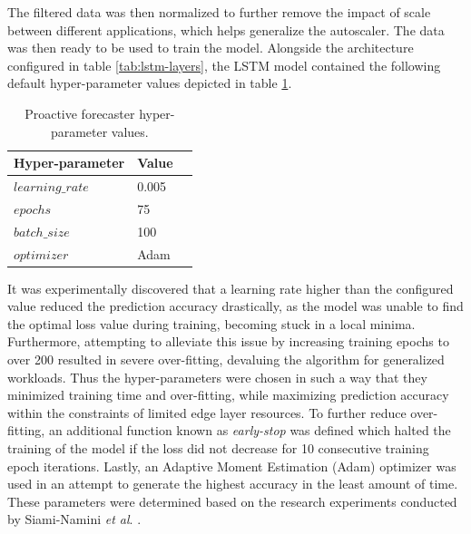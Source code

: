 The filtered data was then normalized to further remove the impact of scale between different applications, which helps generalize the autoscaler. The data was then ready to be used to train the model. Alongside the architecture configured in table \ref{tab:lstm-layers}, the LSTM model contained the following default hyper-parameter values depicted in table \ref{tab:lstm-params}.

\begin{table}
    \caption{Proactive forecaster hyper-parameter values.}\label{tab:lstm-params}
    \centering
    \begin{tabular}{|l|l|l|}
        \hline
        Hyper-parameter & Value\\
        \hline
        $learning\_rate$ & 0.005\\
        $epochs$         & 75\\
        $batch\_size$    & 100\\
        $optimizer$      & Adam\\
        \hline
    \end{tabular}
\end{table}

 It was experimentally discovered that a learning rate higher than the configured value reduced the prediction accuracy drastically, as the model was unable to find the optimal loss value during training, becoming stuck in a local minima. Furthermore, attempting to alleviate this issue by increasing training epochs to over 200 resulted in severe over-fitting, devaluing the algorithm for generalized workloads. Thus the hyper-parameters were chosen in such a way that they minimized training time and over-fitting, while maximizing prediction accuracy within the constraints of limited edge layer resources. To further reduce over-fitting, an additional function known as \textit{early-stop} was defined which halted the training of the model if the loss did not decrease for 10 consecutive training epoch iterations. Lastly, an Adaptive Moment Estimation (Adam) optimizer \cite{diederik2014adam} was used in an attempt to generate the highest accuracy in the least amount of time. These parameters were determined based on the research experiments conducted by Siami-Namini \textit{et al}. \cite{siami2018comparison}.\par

